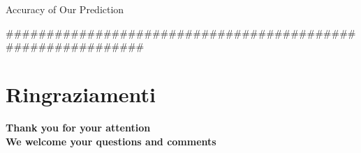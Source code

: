 \documentclass{beamer}
\begin{document}
\begin{frame}{Accuracy of Our Prediction}
\begin{figure}
\begin{minipage}{0.32\textwidth}
        \end{minipage}
    \end{figure}
    \caption{Predictive density estimated for a \(Beta(2,2)\)}

\end{frame}


############################################################
\section{Ringraziamenti}
\begin{frame}

    \centering
    \bigskip
    \bigskip
    \medskip
    
    \Large{\textbf{Thank you for your attention\\We welcome your questions and comments}}

\end{frame}
\end{document}
